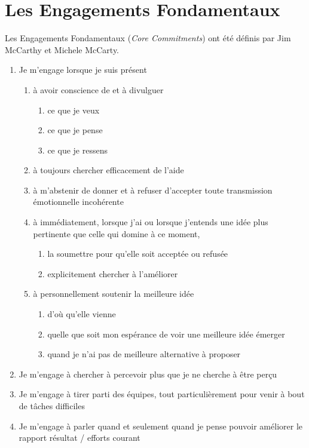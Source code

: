\documentclass{book}
\begin{document}
\chapter{Les Engagements Fondamentaux} \label{engagements}

Les Engagements Fondamentaux (\emph{Core Commitments}) ont été définis par Jim McCarthy et Michele McCarty. 

\begin{enumerate}
	\item Je m'engage lorsque je suis présent
	\begin{enumerate}
		\item à avoir conscience de et à divulguer
		\begin{enumerate}		
			\item ce que je veux
			\item ce que je pense
			\item ce que je ressens
		\end{enumerate}
		\item à toujours chercher efficacement de l'aide 
		\item à m'abstenir de donner et à refuser d'accepter toute transmission émotionnelle incohérente
		\item à immédiatement, lorsque j'ai ou lorsque j'entends une idée plus pertinente que celle qui domine 
		      à ce moment, 
		\begin{enumerate}		
			\item la soumettre pour qu'elle soit acceptée ou refusée
			\item explicitement chercher à l'améliorer
		\end{enumerate}
		\item à personnellement soutenir la meilleure idée
		\begin{enumerate}		
			\item d'où qu'elle vienne
			\item quelle que soit mon espérance de voir une meilleure idée émerger
			\item quand je n'ai pas de meilleure alternative à proposer
		\end{enumerate}
	\end{enumerate}
	\item Je m'engage à chercher à percevoir plus que je ne cherche à être perçu
	\item Je m'engage à tirer parti des équipes, tout particulièrement pour venir à bout de tâches difficiles
	\item Je m'engage à parler quand et seulement quand je pense pouvoir améliorer le rapport résultat / efforts courant

\end{enumerate}
\end{document}

